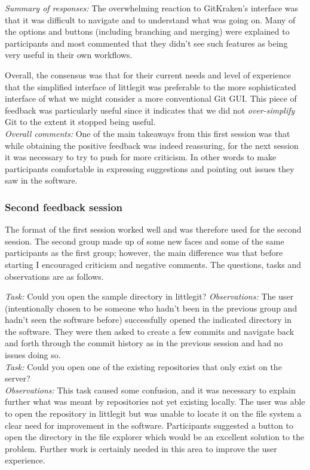 \noindent \emph{Summary of responses: } The overwhelming reaction to GitKraken's interface was that it was difficult to navigate and to understand what was going on. Many of the options and buttons (including branching and merging) were explained to participants and most commented that they didn't see such features as being very useful in their own workflows. 

Overall, the consensus was that for their current needs and level of experience that the simplified interface of littlegit was preferable to the more sophisticated interface of what we might consider a more conventional Git GUI. This piece of feedback was particularly useful since it indicates that we did not \emph{over-simplify} Git to the extent it stopped being useful. \\

\noindent \emph{Overall comments: } One of the main takeaways from this first session was that while obtaining the positive feedback was indeed reassuring, for the next session it was necessary to try to push for more criticism. In other words to make participants comfortable in expressing suggestions and pointing out issues they saw in the software.

\subsubsection{Second feedback session}

The format of the first session worked well and was therefore used for the second session. The second group made up of some new faces and some of the same participants as the first group; however, the main difference was that before starting I encouraged criticism and negative comments. The questions, tasks and observations are as follows.

\noindent \emph{Task: } Could you open the sample directory in littlegit?
\noindent \emph{Observations: } The user (intentionally chosen to be someone who hadn't been in the previous group and hadn't seen the software before) successfully opened the indicated directory in the software. They were then asked to create a few commits and navigate back and forth through the commit history as in the previous session and had no issues doing so.\\

\noindent \emph{Task: } Could you open one of the existing repositories that only exist on the server?\\
\noindent \emph{Observations: } This task caused some confusion, and it was necessary to explain further what was meant by repositories not yet existing locally. The user was able to open the repository in littlegit but was unable to locate it on the file system a clear need for improvement in the software. Participants suggested a button to open the directory in the file explorer which would be an excellent solution to the problem. Further work is certainly needed in this area to improve the user experience. \\

